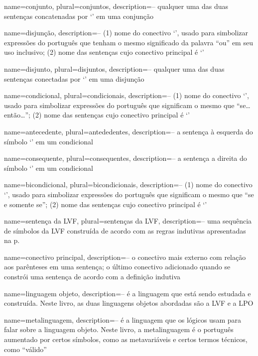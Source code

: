 {
 name=conjunto,
 plural=conjuntos,
 description={-- qualquer uma das duas sentenças concatenadas por `\eand' em uma conjunção}
}

{
 name=disjunção,
 description={-- (1) nome do conectivo `\eor', usado para simbolizar expressões do português que tenham o mesmo significado da palavra ``ou'' em seu uso inclusivo; (2) nome das sentenças cujo conectivo principal é `\eor'}
}

{
 name=disjunto,
 plural=disjuntos,
 description={-- qualquer uma das duas sentenças conectadas por `\eor' em uma disjunção}
}

{
 name=condicional,
 plural=condicionais,
 description={-- (1) nome do conectivo `\eif', usado para simbolizar expressões do português que significam o mesmo que ``se\ldots{}então\ldots''; (2) nome das sentenças cujo conectivo principal é `\eif'}
}

{
 name=antecedente,
 plural=antededentes,
 description={-- a sentença à esquerda do símbolo `\eif' em um condicional}
}

{
 name=consequente,
 plural=consequentes,
 description={-- a sentença a direita do símbolo `\eif' em um condicional}
}

{
 name=bicondicional,
 plural=bicondicionais,
 description={-- (1) nome do conectivo `\eiff', usado para simbolizar expressões do português que significam o mesmo que ``se e somente se''; (2) nome das sentenças cujo conectivo principal é `\eiff'}
}

{
 name=sentença da LVF,
 plural=sentenças da LVF,
 description={-- uma sequência de símbolos da LVF construída de acordo com as regras indutivas apresentadas na p.~\pageref{TFLsentences}}
}

{
 name=conectivo principal,
 description={-- o conectivo mais externo com relação aos parênteses em uma sentença; o último conectivo adicionado quando se constrói uma sentença de acordo com a definição indutiva}
}

{
 name=linguagem objeto,
 description={-- é a linguagem que está sendo estudada e construída. Neste livro, as duas linguagens objetos abordadas são a LVF e a LPO}
}

{
 name=metalinguagem,
 description={-- é a linguagem que os lógicos usam para falar sobre a linguagem objeto. Neste livro, a metalinguagem é o português aumentado por certos símbolos, como as metavariáveis e certos termos técnicos, como ``válido''}
}

